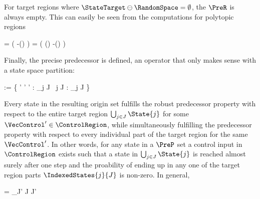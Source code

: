     For target regions where $\StateTarget \ominus \RandomSpace = \emptyset$, the $\PreR$ is always empty.
    This can easily be seen from the computations for polytopic regions

    \startformula
        \startalign[n=2,align={right,left}]
            \NC {} =
            \NC \StateRegion \cap \Big( \StateTarget \oplus -(\MatB \ControlRegion \oplus \RandomSpace) \Big) \MatA \EndAnd
            \NR
            \NC {} =
            \NC \StateRegion \cap \Big( (\StateTarget \ominus \RandomSpace) \oplus -(\MatB \ControlRegion \oplus \RandomSpace) \Big) \MatA \EndPeriod
            \NR
        \stopalign
    \stopformula

    Finally, the precise predecessor is defined, an operator that only makes sense with a state space partition:

    \startformula
        \startalign[n=2,align={right,left}]
            \NC {} := \Big\{ \VecState \in \StateSpace' \Bigmid \exists \VecControl' \in \ControlSpace' :
            \NC {} \subseteq \bigcup_{j \in J}  \;
            \NR
            \NC \empty
            \NC ~\forall j \in J :  \cap \bigcup_{j \in J}  \neq \emptyset \Big\} \EndPeriod
            \NR
        \stopalign
    \stopformula

    Every state in the resulting origin set fulfills the robust predecessor property with respect to the entire target region $\bigcup_{j \in J} \State{j}$ for some $\VecControl' \in \ControlRegion$, while simultaneously fulfilling the predecessor property with respect to every individual part of the target region for the same $\VecControl'$.
    In other words, for any state in a $\PreP$ set a control input in $\ControlRegion$ exists such that a state in $\bigcup_{j \in J} \State{j}$ is reached almost surely after one step and the proability of ending up in any one of the target region parts $\IndexedStates{j}{J}$ is non-zero.
    In general,

    \startformula
         = \bigcup_{\startsubstack \NC J' \subseteq J \NR \NC  J' \ne \emptyset \NR \stopsubstack}  \EndPeriod
    \stopformula

